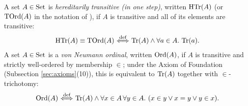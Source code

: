 \documentclass[10pt,a4paper]{article}
\begin{document}
\begin{definition}\label{def:htr_ord}
A set $A \in {\textrm{Set}}$ is \emph{hereditarily transitive (in one step)}, written ${\textrm{HTr}}(A)$ (or ${\textrm{TOrd}}(A)$ in the notation of \cite{TakeutiZaring1982}), if $A$ is transitive and all of its elements are transitive:
$${\textrm{HTr}}(A) \equiv {\textrm{TOrd}}(A) {\stackrel{{\textrm{def}}}{\ \Longleftrightarrow\ }} {\textrm{Tr}}(A)\land \forall a\in A.\ {\textrm{Tr}}(a).$$
A set $A \in {\textrm{Set}}$ is a \emph{von Neumann ordinal}, written ${\textrm{Ord}}(A)$, if $A$ is transitive and strictly well-ordered by membership $\in$; under the Axiom of Foundation (Subsection \ref{sec:axioms}(10)), this is equivalent to ${\textrm{Tr}}(A)$ together with $\in$-trichotomy:
$${\textrm{Ord}}(A) {\stackrel{{\textrm{def}}}{\ \Longleftrightarrow\ }} {\textrm{Tr}}(A) \land \forall x \in A\, \forall y \in A.\ (x \in y \lor x = y \lor y \in x).$$
\end{definition}
\end{document}
